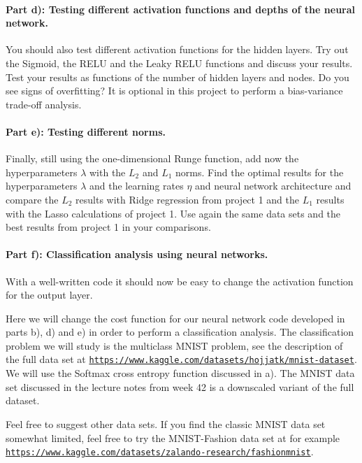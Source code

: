 \documentclass[%
oneside,                 %
final,                   %
10pt]{article}
\begin{document}
\paragraph{Part d): Testing different activation functions and depths of the neural network.}
You should also test different activation functions for the hidden
layers. Try out the Sigmoid, the RELU and the Leaky RELU functions and
discuss your results.  Test your results as functions of the number of hidden layers and nodes. Do you see signs of overfitting?
It is optional in this project to perform a bias-variance trade-off analysis. 

\paragraph{Part e): Testing different norms.}
Finally, still using the one-dimensional Runge function, add now the
hyperparameters $\lambda$ with the $L_2$ and $L_1$ norms.  Find the
optimal results for the hyperparameters $\lambda$ and the learning
rates $\eta$ and neural network architecture and compare the $L_2$ results with Ridge regression from
project 1 and the $L_1$ results with the Lasso calculations of project 1.
Use again the same data sets and the best results from project 1 in your comparisons. 

\paragraph{Part f): Classification  analysis using neural networks.}
With a well-written code it should now be easy to change the
activation function for the output layer.

Here we will change the cost function for our neural network code
developed in parts b), d) and e) in order to perform a classification
analysis.  The classification problem we will study is the multiclass
MNIST problem, see the description of the full data set at
\href{{https://www.kaggle.com/datasets/hojjatk/mnist-dataset}}{\nolinkurl{https://www.kaggle.com/datasets/hojjatk/mnist-dataset}}. We will use the Softmax cross entropy function discussed in a). 
The MNIST data set discussed in the lecture notes from week 42 is a downscaled variant of the full dataset. 

Feel free to suggest other data sets. If you find the classic MNIST data set somewhat limited, feel free to try the  
MNIST-Fashion data set at for example \href{{https://www.kaggle.com/datasets/zalando-research/fashionmnist}}{\nolinkurl{https://www.kaggle.com/datasets/zalando-research/fashionmnist}}.
\end{document}
